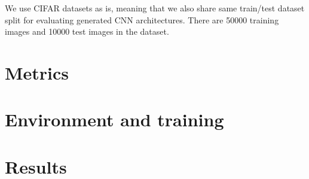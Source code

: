 We use CIFAR datasets as is, meaning that we also share same train/test dataset split for evaluating generated CNN architectures. There are 50000 training images and 10000 test images in the dataset.

\section{Metrics}
\section{Environment and training}
\section{Results}

